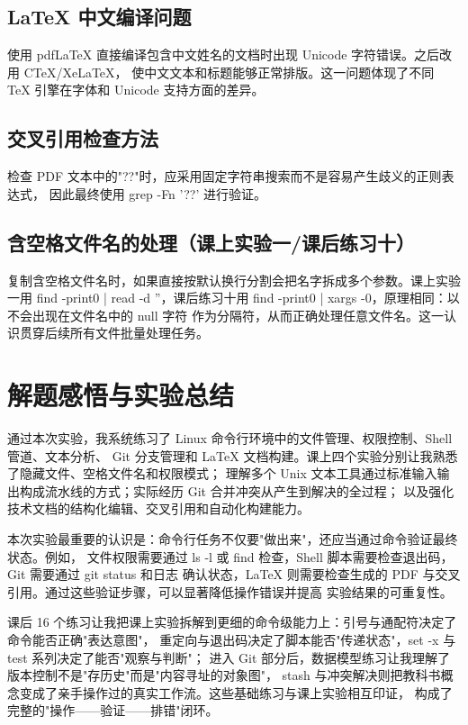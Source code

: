 \documentclass[UTF8]{ctexart}
\begin{document}
\subsection{LaTeX 中文编译问题}

使用 pdfLaTeX 直接编译包含中文姓名的文档时出现 Unicode 字符错误。之后改用 CTeX/XeLaTeX，
使中文文本和标题能够正常排版。这一问题体现了不同 TeX 引擎在字体和 Unicode 支持方面的差异。

\subsection{交叉引用检查方法}

检查 PDF 文本中的"??"时，应采用固定字符串搜索而不是容易产生歧义的正则表达式，
因此最终使用 grep -Fn '??' 进行验证。

\subsection{含空格文件名的处理（课上实验一/课后练习十）}

复制含空格文件名时，如果直接按默认换行分割会把名字拆成多个参数。课上实验一用 find -print0 |
read -d ''，课后练习十用 find -print0 | xargs -0，原理相同：以不会出现在文件名中的 null 字符
作为分隔符，从而正确处理任意文件名。这一认识贯穿后续所有文件批量处理任务。

\section{解题感悟与实验总结}

通过本次实验，我系统练习了 Linux 命令行环境中的文件管理、权限控制、Shell 管道、文本分析、
Git 分支管理和 LaTeX 文档构建。课上四个实验分别让我熟悉了隐藏文件、空格文件名和权限模式；
理解多个 Unix 文本工具通过标准输入输出构成流水线的方式；实际经历 Git 合并冲突从产生到解决的全过程；
以及强化技术文档的结构化编辑、交叉引用和自动化构建能力。

本次实验最重要的认识是：命令行任务不仅要"做出来"，还应当通过命令验证最终状态。例如，
文件权限需要通过 ls -l 或 find 检查，Shell 脚本需要检查退出码，Git 需要通过 git status 和日志
确认状态，LaTeX 则需要检查生成的 PDF 与交叉引用。通过这些验证步骤，可以显著降低操作错误并提高
实验结果的可重复性。

课后 16 个练习让我把课上实验拆解到更细的命令级能力上：引号与通配符决定了命令能否正确"表达意图"，
重定向与退出码决定了脚本能否"传递状态"，set -x 与 test 系列决定了能否"观察与判断"；
进入 Git 部分后，数据模型练习让我理解了版本控制不是"存历史"而是"内容寻址的对象图"，
stash 与冲突解决则把教科书概念变成了亲手操作过的真实工作流。这些基础练习与课上实验相互印证，
构成了完整的"操作——验证——排错"闭环。
\end{document}
